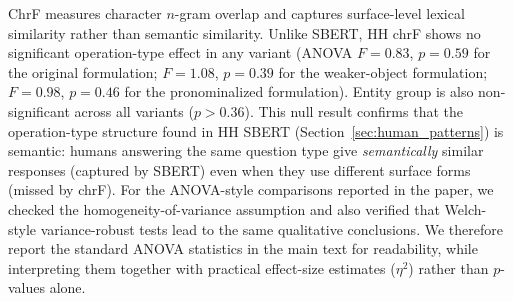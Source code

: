 \documentclass[letterpaper]{article}
\begin{document}
ChrF measures character $n$-gram overlap and captures surface-level
lexical similarity rather than semantic similarity. Unlike SBERT, HH
chrF shows no significant operation-type effect in any variant
(ANOVA $F{=}0.83$, $p{=}0.59$ for the original formulation; $F{=}1.08$, $p{=}0.39$
for the weaker-object formulation; $F{=}0.98$, $p{=}0.46$ for the pronominalized formulation). Entity group is also
non-significant across all variants ($p{>}0.36$). This null result
confirms that the operation-type structure found in HH SBERT
(Section~\ref{sec:human_patterns}) is semantic: humans answering the
same question type give \emph{semantically} similar responses (captured
by SBERT) even when they use different surface forms (missed by chrF).
For the ANOVA-style comparisons reported in the paper, we checked the
homogeneity-of-variance assumption and also verified that Welch-style
variance-robust tests lead to the same qualitative conclusions. We therefore
report the standard ANOVA statistics in the main text for readability, while
interpreting them together with practical effect-size estimates ($\eta^2$)
rather than $p$-values alone.

%


\end{document}
